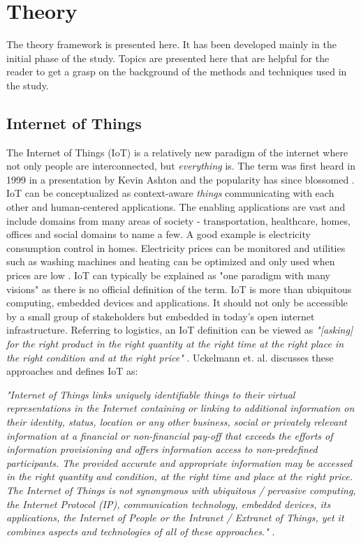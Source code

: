 \chapter{Theory}
\label{cha:theory}

The theory framework is presented here. It has been developed mainly in the
initial phase of the study. Topics are presented here that are helpful for the
reader to get a grasp on the background of the methods and techniques used in
the study.

\section{Internet of Things}

The Internet of Things (IoT) is a relatively new paradigm of the internet where
not only people are interconnected, but \textit{everything} is. The term was
first heard in 1999 in a presentation by Kevin Ashton \cite{ashton2011internet}
and the popularity has since blossomed \cite{gubbi2013internet}. IoT can be
conceptualized as context-aware \textit{things} communicating with each other
and human-centered applications. The enabling applications are vast and include
domains from many areas of society - transportation, healthcare, homes, offices
and social domains to name a few. A good example is electricity consumption
control in homes. Electricity prices can be monitored and utilities such as
washing machines and heating can be optimized and only used when prices are low
\cite{atzori2010internet}. IoT can typically be explained as "one paradigm with
many visions" \cite{atzori2010internet} as there is no official definition of
the term. IoT is more than ubiquitous computing, embedded devices and
applications. It should not only be accessible by a small group of stakeholders
but embedded in today's open internet infrastructure. Referring to logistics,
an IoT definition can be viewed as \textit{"[asking] for the right product in
the right quantity at the right time at the right place in the right condition
and at the right price"} \cite{uckelmann2011architectural}. Uckelmann et. al.
discusses these approaches and defines IoT as:

\begin{center}
\textit{"Internet of Things links
uniquely identifiable things to their virtual representations in the Internet
containing or linking to additional information on their identity, status,
location or any other business, social or privately relevant information at a
financial or non-financial pay-off that exceeds the efforts of information
provisioning and offers information access to non-predefined participants. The
provided accurate and appropriate information may be accessed in the right
quantity and condition, at the right time and place at the right price. The
Internet of Things is not synonymous with ubiquitous / pervasive computing, the
Internet Protocol (IP), communication technology, embedded devices, its
applications, the Internet of People or the Intranet / Extranet of Things, yet
it combines aspects and technologies of all of these approaches."}
\cite{uckelmann2011architectural}.
\end{center}


